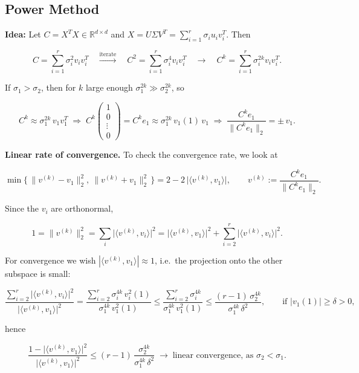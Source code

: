 \documentclass[
  letterpaper,
  DIV=11,
  numbers=noendperiod]{scrreprt}
\theoremstyle{definition}
\theoremstyle{plain}
\theoremstyle{plain}
\theoremstyle{definition}
\theoremstyle{plain}
\theoremstyle{plain}
\theoremstyle{remark}
\begin{document}
\subsection{Power Method}\label{power-method}

\textbf{Idea:} Let \(C = X^T X \in \mathbb{R}^{d \times d}\) and
\(X = U \Sigma V^T = \sum_{i=1}^{r} \sigma_i u_i v_i^T\). Then

\[
C = \sum_{i=1}^{r} \sigma_i^2 v_i v_i^T
\quad\xrightarrow{\text{iterate}}\quad
C^2 = \sum_{i=1}^{r} \sigma_i^4 v_i v_i^T
\quad\longrightarrow\quad
C^k = \sum_{i=1}^{r} \sigma_i^{2k} v_i v_i^T .
\]

If \(\sigma_1 > \sigma_2\), then for \(k\) large enough
\(\sigma_1^{2k} \gg \sigma_2^{2k}\), so

\[
C^k \approx \sigma_1^{2k}\, v_1 v_1^T
\;\Rightarrow\;
C^k \begin{pmatrix} 1 \\ 0 \\ \vdots \\ 0 \end{pmatrix}
= C^k e_1 \approx \sigma_1^{2k}\, v_1(1)\, v_1
\;\Rightarrow\;
\frac{C^k e_1}{\|C^k e_1\|_2} = \pm\, v_1 .
\]

\textbf{Linear rate of convergence.} To check the convergence rate, we
look at

\[
\min\Big\{\, \|v^{(k)} - v_1\|_2^2,\ \|v^{(k)} + v_1\|_2^2 \,\Big\} = 2 - 2\,\big|\langle v^{(k)}, v_1\rangle\big|,
\qquad v^{(k)} := \frac{C^k e_1}{\|C^k e_1\|_2}.
\]

Since the \(v_i\) are orthonormal,

\[
1 = \|v^{(k)}\|_2^2 = \sum_{i} \big|\langle v^{(k)}, v_i\rangle\big|^2 = \big|\langle v^{(k)}, v_1\rangle\big|^2 + \sum_{i=2}^{r} \big|\langle v^{(k)}, v_i\rangle\big|^2 .
\]

For convergence we wish \(|\langle v^{(k)}, v_1\rangle| \approx 1\),
i.e.~the projection onto the other subspace is small:

\[
\frac{\sum_{i=2}^{r} \big|\langle v^{(k)}, v_i\rangle\big|^2}{\big|\langle v^{(k)}, v_1\rangle\big|^2}
= \frac{\sum_{i=2}^{r} \sigma_i^{4k}\, v_i^2(1)}{\sigma_1^{4k}\, v_1^2(1)}
\le \frac{\sum_{i=2}^{r} \sigma_i^{4k}}{\sigma_1^{4k}\, v_1^2(1)}
\le \frac{(r-1)\, \sigma_2^{4k}}{\sigma_1^{4k}\, \delta^2},
\qquad \text{if } |v_1(1)| \ge \delta > 0 ,
\]

hence

\[
\frac{1 - \big|\langle v^{(k)}, v_1\rangle\big|^2}{\big|\langle v^{(k)}, v_1\rangle\big|^2}
\le (r-1)\, \frac{\sigma_2^{4k}}{\sigma_1^{4k}\, \delta^2}
\;\longrightarrow\; \text{linear convergence, as } \sigma_2 < \sigma_1 .
\]
\end{document}
